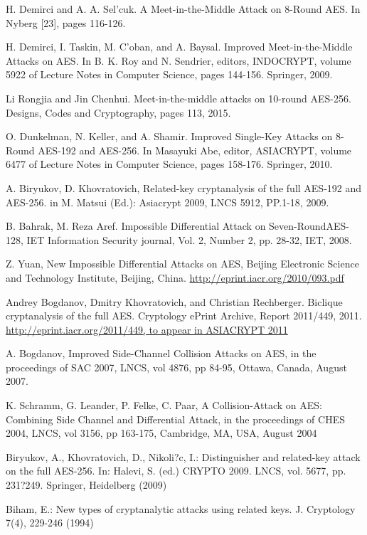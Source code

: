 \documentclass[twoside]{article}
\begin{document}
\begin{thebibliography}{99}
H. Demirci and A. A. Sel'cuk. A Meet-in-the-Middle Attack on 8-Round AES. In Nyberg [23], pages 116-126.

H. Demirci, I. Taskin, M. C'oban, and A. Baysal. Improved Meet-in-the-Middle Attacks on AES. In B. K. Roy and N. Sendrier, editors, INDOCRYPT, volume 5922 of Lecture Notes in Computer Science, pages 144-156. Springer, 2009.

Li Rongjia and Jin Chenhui. Meet-in-the-middle attacks on 10-round AES-256. Designs, Codes and Cryptography, pages 113, 2015.

O. Dunkelman, N. Keller, and A. Shamir. Improved Single-Key Attacks on 8- Round AES-192 and AES-256. In Masayuki Abe, editor, ASIACRYPT, volume 6477 of Lecture Notes in Computer Science, pages 158-176. Springer, 2010.

A. Biryukov, D. Khovratovich, Related-key cryptanalysis of the full AES-192 and AES-256. in M. Matsui (Ed.): Asiacrypt 2009, LNCS 5912, PP.1-18, 2009.

B. Bahrak, M. Reza Aref. Impossible Differential Attack on Seven-RoundAES-128, IET Information Security journal, Vol. 2, Number 2, pp. 28-32, IET, 2008. 

Z. Yuan, New Impossible Differential Attacks on AES, Beijing Electronic Science and Technology Institute, Beijing, China.
\newblock \url{http://eprint.iacr.org/2010/093.pdf}

Andrey Bogdanov, Dmitry Khovratovich, and Christian Rechberger. Biclique cryptanalysis of the full AES. Cryptology ePrint Archive, Report 2011/449, 2011.
\newblock \url{http://eprint.iacr.org/2011/449, to appear in ASIACRYPT 2011}

A. Bogdanov, Improved Side-Channel Collision Attacks on AES, in the proceedings of SAC 2007, LNCS, vol 4876, pp 84-95, Ottawa, Canada, August 2007.

K. Schramm, G. Leander, P. Felke, C. Paar, A Collision-Attack on AES: Combining Side Channel and Differential Attack, in the proceedings of CHES 2004, LNCS, vol 3156, pp 163-175, Cambridge, MA, USA, August 2004

Biryukov, A., Khovratovich, D., Nikoli?c, I.: Distinguisher and related-key attack on the full AES-256. In: Halevi, S. (ed.) CRYPTO 2009. LNCS, vol. 5677, pp. 231?249. Springer, Heidelberg (2009)

Biham, E.: New types of cryptanalytic attacks using related keys. J. Cryptology 7(4), 229-246 (1994)


\end{thebibliography}
\end{document}
